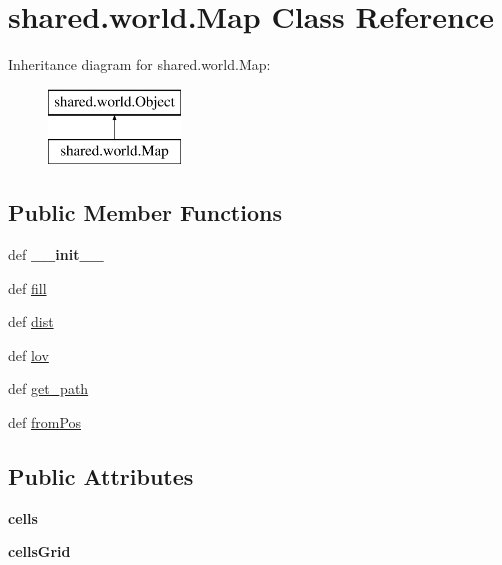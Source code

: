 \hypertarget{classshared_1_1world_1_1_map}{\section{shared.\-world.\-Map \-Class \-Reference}
\label{classshared_1_1world_1_1_map}
}
\-Inheritance diagram for shared.\-world.\-Map\-:\begin{figure}[H]
\begin{center}
\leavevmode
\includegraphics[height=2.000000cm]{classshared_1_1world_1_1_map}
\end{center}
\end{figure}
\subsection*{\-Public \-Member \-Functions}
\begin{DoxyCompactItemize}
\item 
\hypertarget{classshared_1_1world_1_1_map_a6ecf1a8cfa34de77286042236bab52bb}{def {\bfseries \-\_\-\-\_\-init\-\_\-\-\_\-}}\label{classshared_1_1world_1_1_map_a6ecf1a8cfa34de77286042236bab52bb}

\item 
def \hyperlink{classshared_1_1world_1_1_map_ab7d203c2be9b13fdbd13c73eedebdbb8}{fill}
\item 
def \hyperlink{classshared_1_1world_1_1_map_aca622d03ed857f3f96bb58a4ae832a78}{dist}
\item 
def \hyperlink{classshared_1_1world_1_1_map_a28559574f2dd9654f9a6b6fad260ff4e}{lov}
\item 
def \hyperlink{classshared_1_1world_1_1_map_a4e919a8097cf188722d29dd44c8af76f}{get\-\_\-path}
\item 
def \hyperlink{classshared_1_1world_1_1_map_a3034d973a018bbb50638e07a74f6bb86}{from\-Pos}
\end{DoxyCompactItemize}
\subsection*{\-Public \-Attributes}
\begin{DoxyCompactItemize}
\item 
\hypertarget{classshared_1_1world_1_1_map_a2c42644f29c38355e8960eae50dc15c5}{{\bfseries cells}}\label{classshared_1_1world_1_1_map_a2c42644f29c38355e8960eae50dc15c5}

\item 
\hypertarget{classshared_1_1world_1_1_map_a586adeb6f3a044ff46975d9e34a3fe57}{{\bfseries cells\-Grid}}\label{classshared_1_1world_1_1_map_a586adeb6f3a044ff46975d9e34a3fe57}

\end{DoxyCompactItemize}


